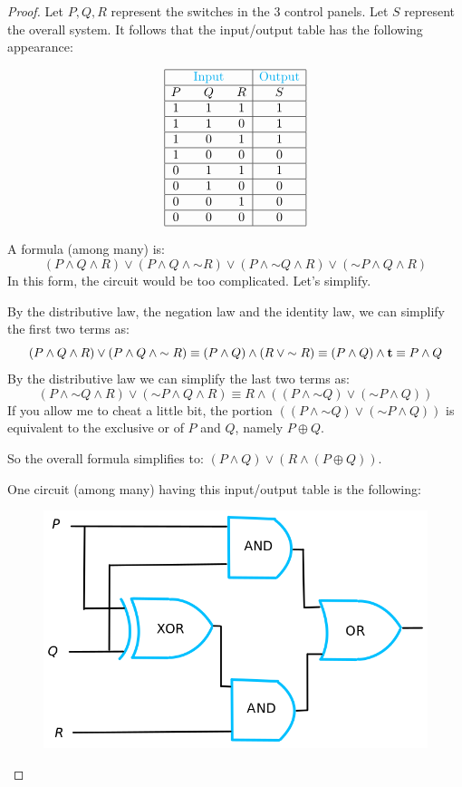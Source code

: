 \documentclass[14pt]{extarticle}
\begin{document}
\begin{proof} Let $P, Q, R$ represent the switches in the 3 control panels. Let
$S$ represent the overall system. It follows that the input/output table has the
following appearance:

$$ \begin{array}{|ccc|c|} \hline & \color{cyan}\text{Input} & &
\color{cyan}\text{Output} \\ \hline P&Q&R&S\\ \hline 1&1&1&1\\ \hline 1&1&0&1\\
\hline 1&0&1&1\\ \hline 1&0&0&0\\ \hline 0&1&1&1\\ \hline 0&1&0&0\\ \hline
0&0&1&0\\ \hline 0&0&0&0\\ \hline \end{array} $$

A formula (among many) is: $$ (P \wedge Q \wedge R) \vee (P \wedge Q \wedge
{\sim R}) \vee (P \wedge {\sim Q} \wedge R) \vee ({\sim P} \wedge Q \wedge R) $$
In this form, the circuit would be too complicated. Let's simplify.

By the distributive law, the negation law and the identity law, we can simplify
the first two terms as: $$ (P \wedge Q \wedge R) \vee (P \wedge Q \wedge {\sim
R}) \equiv (P \wedge Q) \wedge (R \vee {\sim R}) \equiv (P \wedge Q) \wedge
{\bf t} \equiv P \wedge Q $$ By the distributive law we can simplify the last two
terms as: $$ (P \wedge {\sim Q} \wedge R) \vee ({\sim P} \wedge Q \wedge R)
\equiv R \wedge ((P \wedge {\sim Q}) \vee ({\sim P} \wedge Q)) $$ If you allow
me to cheat a little bit, the portion $((P \wedge {\sim Q}) \vee ({\sim P}
\wedge Q))$ is equivalent to the exclusive or of $P$ and $Q$, namely $P \oplus
Q$.

So the overall formula simplifies to: $(P \wedge Q) \vee (R \wedge (P \oplus
Q))$.

One circuit (among many) having this input/output table is the following:

\begin{figure}[ht!] \centering \includegraphics[scale=0.3]{../images/2.4.25.png}
\end{figure} \end{proof}
\end{document}

